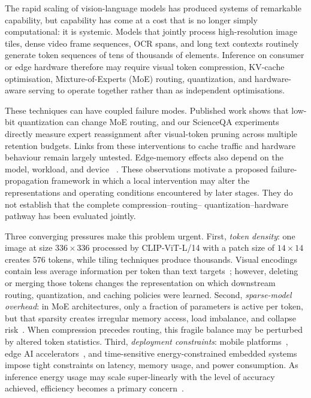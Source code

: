 \documentclass[10pt]{article}
\newenvironment{reviewchange}{\begingroup\color{red}}{\endgroup}
\begin{document}
The rapid scaling of vision-language models has produced systems of remarkable
capability, but capability has come at a cost that is no longer simply computational:
it is systemic.  Models that jointly process high-resolution image tiles, dense video
frame sequences, OCR spans, and long text contexts routinely generate token sequences
of tens of thousands of elements.  Inference on consumer or edge hardware therefore
may require visual token compression, KV-cache optimisation, Mixture-of-Experts (MoE)
routing, quantization, and hardware-aware serving to operate together rather than as
independent optimisations.

\begin{reviewchange}
These techniques can have coupled failure modes. Published work shows that low-bit
quantization can change MoE routing, and our ScienceQA experiments directly measure
expert reassignment after visual-token pruning across multiple retention budgets.
Links from these interventions to cache traffic and hardware behaviour remain
largely untested. Edge-memory effects also depend on the model, workload, and device
~\citep{shao2026surveytokencompressionefficient,liu2025surveyinferenceoptimizationtechniques,fu2026eaquantenhancingposttrainingquantization,zhong2026breakingmodalityheterogeneitylowbit,10906629}.
These observations motivate a proposed failure-propagation framework in which a local
intervention may alter the representations and operating conditions encountered by
later stages. They do not establish that the complete compression--routing--
quantization--hardware pathway has been evaluated jointly.

\end{reviewchange}

Three converging pressures make this problem urgent.  First, \emph{token density}: one
image at size $336\!\times\!336$ processed by CLIP-ViT-L/14 with a patch size of
$14\!\times\!14$ creates 576 tokens, while tiling techniques produce thousands.
Visual encodings contain less average information per token than text
targets~\citep{shao2026surveytokencompressionefficient}; however, deleting or merging those tokens changes the
representation on which downstream routing, quantization, and caching policies were
learned.  Second, \emph{sparse-model overhead}: in MoE architectures, only a fraction
of parameters is active per token, but that sparsity creates irregular memory access,
load imbalance, and collapse risk~\citep{liu2025surveyinferenceoptimizationtechniques,sha2026sparsemixtureofexpertsroutingvisual}.  When compression precedes routing, this
fragile balance may be perturbed by altered token statistics.  Third,
\emph{deployment constraints}: mobile platforms~\citep{li2025palmbenchcomprehensivebenchmarkcompressed}, edge AI
accelerators~\citep{chittyvenkata2024llminferencebenchinferencebenchmarkinglarge}, and time-sensitive energy-constrained embedded
systems impose tight constraints on latency, memory usage, and power consumption. As
inference energy usage may scale super-linearly with the level of accuracy achieved,
efficiency becomes a primary concern~\citep{yang2024doubleexponentialincreasesinferenceenergy}.
\end{document}
